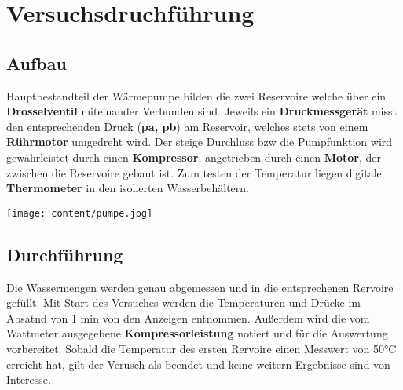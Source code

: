 \section{Versuchsdruchführung}
\label{sec:Versuchsdruchführung}





\noindent\begin{minipage}{0.5\textwidth}
\subsection{Aufbau}
\label{sec:Aufbau}
Hauptbestandteil der Wärmepumpe bilden die zwei Reservoire welche über ein  \\
\textbf{Drosselventil} miteinander Verbunden sind. Jeweils ein \textbf{Druckmessgerät} misst 
den entsprechenden Druck (\textbf{pa, pb}) am Reservoir, welches stets von einem \textbf{Rührmotor} umgedreht wird.
Der steige Durchluss bzw die Pumpfunktion wird gewährleistet durch einen \textbf{Kompressor}, angetrieben durch einen \textbf{Motor}, %
 der zwischen die Reservoire gebaut ist. Zum testen der Temperatur liegen digitale 
\textbf{Thermometer} in den isolierten Wasserbehältern.
\end{minipage}
\hfill
\begin{minipage}{0.5\textwidth}\raggedleft
\vspace{2cm}
\texttt{[image: content/pumpe.jpg]}

\end{minipage}


\subsection{Durchführung}
\label{sec:Durchfuehrung}
Die Wassermengen werden genau abgemessen und in die entsprechenen Rervoire gefüllt. %
Mit Start des Versuches werden die Temperaturen und Drücke im Absatnd von 1 min von den Anzeigen entnommen. Außerdem wird die vom Wattmeter ausgegebene \textbf{Kompressorleistung} notiert und für 
die Auswertung vorbereitet. Sobald die Temperatur des ersten Rervoire einen Messwert von 50°C erreicht hat, gilt der Verusch als beendet und keine weitern Ergebnisse sind von Interesse.
